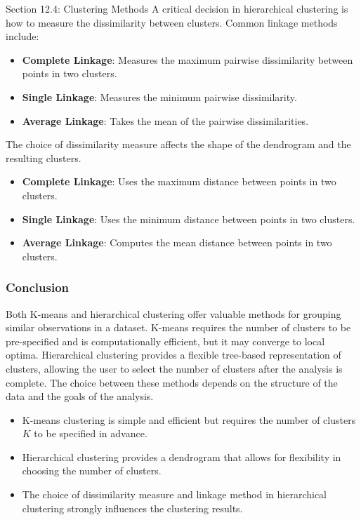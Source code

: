 \begin{notes}{Section 12.4: Clustering Methods}
    A critical decision in hierarchical clustering is how to measure the dissimilarity between clusters. Common linkage methods include:
    \begin{itemize}
        \item \textbf{Complete Linkage}: Measures the maximum pairwise dissimilarity between points in two clusters.
        \item \textbf{Single Linkage}: Measures the minimum pairwise dissimilarity.
        \item \textbf{Average Linkage}: Takes the mean of the pairwise dissimilarities.
    \end{itemize}
    The choice of dissimilarity measure affects the shape of the dendrogram and the resulting clusters.
    
    \begin{highlight}
        \begin{itemize}
            \item \textbf{Complete Linkage}: Uses the maximum distance between points in two clusters.
            \item \textbf{Single Linkage}: Uses the minimum distance between points in two clusters.
            \item \textbf{Average Linkage}: Computes the mean distance between points in two clusters.
        \end{itemize}
    \end{highlight}
    
    \subsubsection*{Conclusion}
    
    Both K-means and hierarchical clustering offer valuable methods for grouping similar observations in a dataset. K-means requires the number of clusters to be pre-specified and is computationally efficient, 
    but it may converge to local optima. Hierarchical clustering provides a flexible tree-based representation of clusters, allowing the user to select the number of clusters after the analysis is complete. 
    The choice between these methods depends on the structure of the data and the goals of the analysis.
    
    \begin{highlight}
        \begin{itemize}
            \item K-means clustering is simple and efficient but requires the number of clusters \( K \) to be specified in advance.
            \item Hierarchical clustering provides a dendrogram that allows for flexibility in choosing the number of clusters.
            \item The choice of dissimilarity measure and linkage method in hierarchical clustering strongly influences the clustering results.
        \end{itemize}
    \end{highlight}
\end{notes}